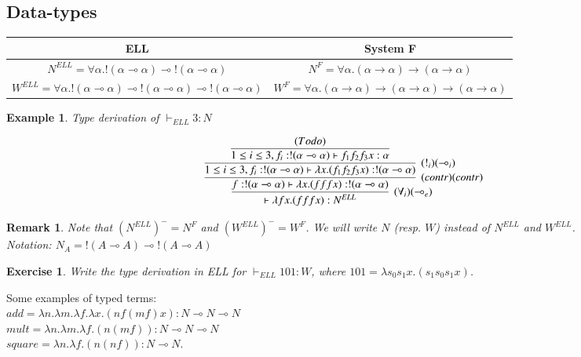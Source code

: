 \documentclass[a4paper,10pt]{article}
\newcommand{\impl}{\rightarrow}	%
\newcommand{\limpl}{\multimap}  %
\newtheorem{ex}{Example}
\newtheorem{exo}{Exercise}
\newtheorem{rmk}{Remark}
\begin{document}
\subsection{Data-types}

\begin{center}
\begin{tabular}{|c|c|}
\hline
ELL & System F \\
\hline
$N^{ELL} = \forall \alpha. !(\alpha \limpl \alpha) \limpl !(\alpha \limpl \alpha)$ & $N^{F} = \forall \alpha. (\alpha \impl \alpha) \impl (\alpha \impl \alpha)$\\
\hline
$W^{ELL} = \forall \alpha. !(\alpha \limpl \alpha) \limpl !(\alpha \limpl \alpha) \limpl !(\alpha \limpl \alpha)$ & $W^{F} = \forall \alpha. (\alpha \impl \alpha) \impl (\alpha \impl \alpha) \impl (\alpha \impl \alpha)$\\
\hline
\end{tabular}
\end{center}


\begin{ex}{Type derivation of $\vdash_{ELL} 3:N$}

$$ \infer[(\forall_i) (\limpl_e)]{\vdash \lambda f x.(f f f x) : N^{ELL}}
	{
	\infer[(contr) (contr)]{f: !(\alpha \limpl \alpha) \vdash \lambda x.(f f f x) : !(\alpha \limpl \alpha)}
		{
		\infer[(!_i) (\limpl_i)]{1 \leq i \leq 3, f_i: !(\alpha \limpl \alpha) \vdash \lambda x. (f_1 f_2 f_3 x) : !(\alpha \limpl \alpha)}
			{
				\infer{1 \leq i \leq 3, f_i: !(\alpha \limpl \alpha) \vdash f_1 f_2 f_3 x : \alpha}
				{(To do)}
			}
		}
	}$$
\end{ex}

\begin{rmk}
Note that $(N^{ELL})^{-} = N^{F}$ and $(W^{ELL})^{-} = W^{F}$. We will write $N$ (resp. $W$) instead of $N^{ELL}$ and $W^{ELL}$.\\
Notation: $N_A = !(A \limpl A) \limpl !(A \limpl A)$
\end{rmk}

\begin{exo}
Write the type derivation in ELL for $\vdash_{ELL} 101 : W$, where $101 = \lambda s_0 s_1 x. (s_1 s_0 s_1 x)$.
\end{exo}

 Some examples of typed terms:\\
$add = \lambda n. \lambda m. \lambda f. \lambda x. (n f (m f) x) : N \limpl N \limpl N$\\
$mult = \lambda n. \lambda m. \lambda f. (n (m f)) : N \limpl N \limpl N$\\
$square = \lambda n. \lambda f. (n (n f)) : N \limpl N$.
\end{document}
